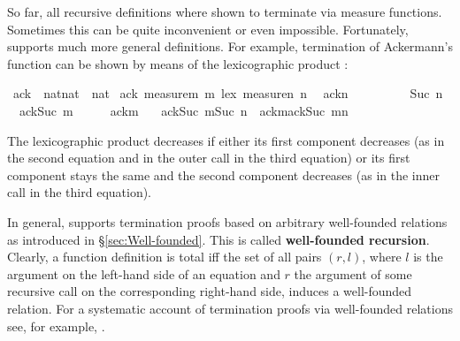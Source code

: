 %
\begin{isabellebody}%
\def\isabellecontext{WFrec}%
%
\begin{isamarkuptext}%
\noindent
So far, all recursive definitions where shown to terminate via measure
functions. Sometimes this can be quite inconvenient or even
impossible. Fortunately,  supports much more
general definitions. For example, termination of Ackermann's function
can be shown by means of the lexicographic product :%
\end{isamarkuptext}%
\ ack\ {\isacharcolon}{\isacharcolon}\ {\isachardoublequote}nat{\isasymtimes}nat\ {\isasymRightarrow}\ nat{\isachardoublequote}\isanewline
{}\ ack\ {\isachardoublequote}measure{\isacharparenleft}{\isasymlambda}m{\isachardot}\ m{\isacharparenright}\ {\isacharless}{\isacharasterisk}lex{\isacharasterisk}{\isachargreater}\ measure{\isacharparenleft}{\isasymlambda}n{\isachardot}\ n{\isacharparenright}{\isachardoublequote}\isanewline
\ \ {\isachardoublequote}ack{\isacharparenleft}{}{\isacharcomma}n{\isacharparenright}\ \ \ \ \ \ \ \ \ {\isacharequal}\ Suc\ n{\isachardoublequote}\isanewline
\ \ {\isachardoublequote}ack{\isacharparenleft}Suc\ m{\isacharcomma}{}{\isacharparenright}\ \ \ \ \ {\isacharequal}\ ack{\isacharparenleft}m{\isacharcomma}\ {}{\isacharparenright}{\isachardoublequote}\isanewline
\ \ {\isachardoublequote}ack{\isacharparenleft}Suc\ m{\isacharcomma}Suc\ n{\isacharparenright}\ {\isacharequal}\ ack{\isacharparenleft}m{\isacharcomma}ack{\isacharparenleft}Suc\ m{\isacharcomma}n{\isacharparenright}{\isacharparenright}{\isachardoublequote}%
\begin{isamarkuptext}%
\noindent
The lexicographic product decreases if either its first component
decreases (as in the second equation and in the outer call in the
third equation) or its first component stays the same and the second
component decreases (as in the inner call in the third equation).

In general,  supports termination proofs based on
arbitrary well-founded relations as introduced in \S\ref{sec:Well-founded}.
This is called \textbf{well-founded
recursion}. Clearly, a function definition is
total iff the set of all pairs $(r,l)$, where $l$ is the argument on the
left-hand side of an equation and $r$ the argument of some recursive call on
the corresponding right-hand side, induces a well-founded relation.  For a
systematic account of termination proofs via well-founded relations see, for
example, \cite{Baader-Nipkow}.


\end{isamarkuptext}
\end{isabellebody}
